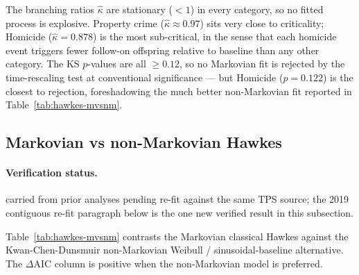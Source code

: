 \documentclass[article,shortnames,nojss]{jss}
\begin{document}
The branching ratios $\hat\kappa$ are stationary ($<1$) in every
category, so no fitted process is explosive.  Property crime
($\hat\kappa\approx 0.97$) sits very close to criticality;
Homicide ($\hat\kappa = 0.878$) is the most sub-critical, in the
sense that each homicide event triggers fewer follow-on offspring
relative to baseline than any other category.  The KS $p$-values
are all $\ge 0.12$, so no Markovian fit is rejected by the
time-rescaling test at conventional significance --- but
Homicide ($p=0.122$) is the closest to rejection, foreshadowing the
much better non-Markovian fit reported in
Table~\ref{tab:hawkes-mvsnm}.

\subsection{Markovian vs non-Markovian Hawkes}\label{phys-markov-nonmarkov}


\paragraph*{Verification status.}
carried from prior analyses pending re-fit against the same TPS source; the 2019 contiguous re-fit paragraph below is the one new verified result in this subsection.

Table~\ref{tab:hawkes-mvsnm} contrasts the Markovian classical
Hawkes against the Kwan-Chen-Dunsmuir non-Markovian Weibull /
sinusoidal-baseline alternative.  The $\Delta\mathrm{AIC}$ column
is positive when the non-Markovian model is preferred.
\end{document}

